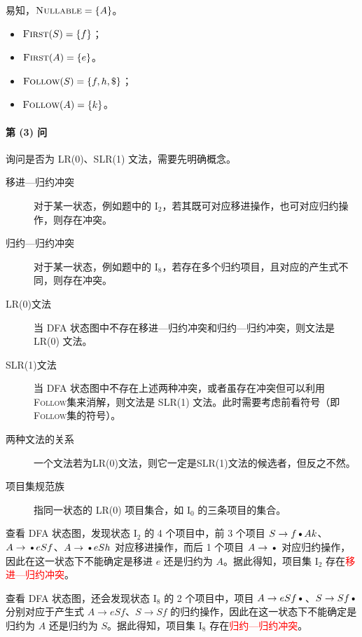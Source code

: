 \documentclass[UTF8]{ctexart}
\newcommand\FIRST{\textsc{First}}
\newcommand\FOLLOW{\textsc{Follow}}
\newcommand\NULLABLE{\textsc{Nullable}}
\newcommand\D{\text{\textbullet}}
\begin{document}
易知，$\NULLABLE = \{A\}$。

\begin{itemize}[itemsep=0pt,parsep=0pt]
  \item $\FIRST(S) = \{f\}$；
  \item $\FIRST(A) = \{e\}$。
\end{itemize}

\begin{itemize}[itemsep=0pt,parsep=0pt]
  \item $\FOLLOW(S) = \{f,h,\$\}$；
  \item $\FOLLOW(A) = \{k\}$。
\end{itemize}

\paragraph{第 (3) 问} 询问是否为 LR(0)、SLR(1) 文法，需要先明确概念。

\begin{tcolorbox}[colback=violet!5, colframe=violet, boxrule=1pt, breakable]
\begin{description}
    \item[移进—归约冲突] 对于某一状态，例如题中的 $\mathrm{I_2}$，若其既可对应移进操作，也可对应归约操作，则存在冲突。
    \item[归约—归约冲突] 对于某一状态，例如题中的 $\mathrm{I_8}$，若存在多个归约项目，且对应的产生式不同，则存在冲突。
    \item[LR(0)文法] 当 DFA 状态图中不存在移进—归约冲突和归约—归约冲突，则文法是 LR(0) 文法。
    \item[SLR(1)文法] 当 DFA 状态图中不存在上述两种冲突，或者虽存在冲突但可以利用 \FOLLOW 集来消解，则文法是 SLR(1) 文法。此时需要考虑前看符号（即 \FOLLOW 集的符号）。
    \item[两种文法的关系] 一个文法若为LR(0)文法，则它一定是SLR(1)文法的候选者，但反之不然。
    \item[项目集规范族] 指同一状态的 LR(0) 项目集合，如 $\mathrm{I_0}$ 的三条项目的集合。
\end{description}
\end{tcolorbox}

查看 DFA 状态图，发现状态 $\mathrm{I_2}$ 的 4 个项目中，前 3 个项目 $S\to f\D Ak$、$A\to \D eSf$、$A\to \D eSh$ 对应移进操作，而后 1 个项目 $A\to\D$ 对应归约操作，因此在这一状态下不能确定是移进 $e$ 还是归约为 $A$。据此得知，项目集 $\mathrm{I_2}$ 存在\textcolor{red}{移进—归约冲突}。

查看 DFA 状态图，还会发现状态 $\mathrm{I_8}$ 的 2 个项目中，项目 $A\to eSf\D$、$S\to Sf\D$ 分别对应于产生式 $A\to eSf$、$S\to Sf$ 的归约操作，因此在这一状态下不能确定是归约为 $A$ 还是归约为 $S$。据此得知，项目集 $\mathrm{I_8}$ 存在\textcolor{red}{归约—归约冲突}。
\end{document}
